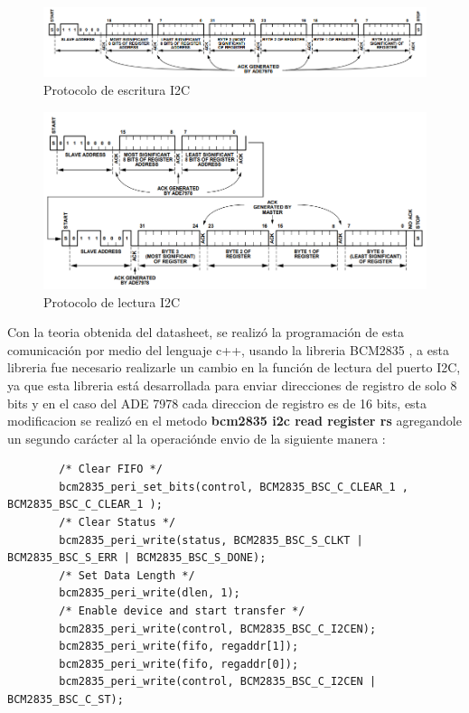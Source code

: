         \begin{figure}[H]
            \begin{center}
                \includegraphics[width = 15cm]{3Proyecto/I2CProtocol.PNG}
                \caption{ Protocolo de escritura I2C} 
                \label{fig:I2C protocol write}
            \end{center}
        \end{figure}
        \begin{figure}[H]
            \begin{center}
                \includegraphics[width = 15cm]{3Proyecto/I2CProtocolRead.PNG}
                \caption{ Protocolo de lectura I2C} 
                \label{fig:I2C protocol read}
            \end{center}
        \end{figure}

        Con la teoria obtenida del datasheet, se realizó la programación de esta comunicación por medio del lenguaje c++, usando la libreria BCM2835 \cite{A40}, a esta libreria fue necesario realizarle un cambio en la función de lectura del puerto I2C, ya que esta libreria está desarrollada para enviar direcciones de registro de solo 8 bits y en el caso del ADE 7978 cada direccion de registro es de 16 bits, esta modificacion se realizó en el metodo \textbf{bcm2835 i2c read register rs} agregandole un segundo carácter al la operaciónde envio de la siguiente manera :
        \begin{lstlisting}
        /* Clear FIFO */
        bcm2835_peri_set_bits(control, BCM2835_BSC_C_CLEAR_1 , BCM2835_BSC_C_CLEAR_1 );
        /* Clear Status */
        bcm2835_peri_write(status, BCM2835_BSC_S_CLKT | BCM2835_BSC_S_ERR | BCM2835_BSC_S_DONE);
        /* Set Data Length */
        bcm2835_peri_write(dlen, 1);
        /* Enable device and start transfer */
        bcm2835_peri_write(control, BCM2835_BSC_C_I2CEN);
        bcm2835_peri_write(fifo, regaddr[1]);
        bcm2835_peri_write(fifo, regaddr[0]);
        bcm2835_peri_write(control, BCM2835_BSC_C_I2CEN | BCM2835_BSC_C_ST);
        \end{lstlisting}

